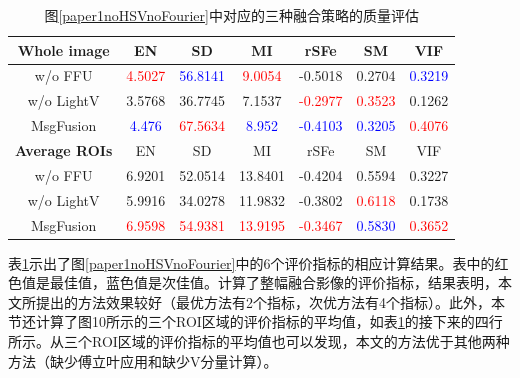      
\begin{table}[ht]
    \centering
  \caption{图\ref{paper1noHSVnoFourier}中对应的三种融合策略的质量评估}\label{paper1AblationIndex}
\begin{tabular}{ccccccc}
\hline
\textbf{Whole image}  &  EN         &  SD         &  MI         &  rSFe   &  SM         &  VIF  \\ \hline
w/o FFU                   &  \textcolor{red}{ 4.5027}      &  \textcolor{blue}{ 56.8141}     &  \textcolor{red}{ 9.0054}      & -0.5018                        & 0.2704                             &  \textcolor{blue}{ 0.3219} \\ 
w/o LightV                & 3.5768                             & 36.7745                            & 7.1537                             &  \textcolor{red}{ -0.2977} &  \textcolor{red}{ 0.3523}      & 0.1262                        \\ 
MsgFusion             &  \textcolor{blue}{ 4.476}       &  \textcolor{red}{ 67.5634}     &  \textcolor{blue}{ 8.952}       &  \textcolor{blue}{ -0.4103} &  \textcolor{blue}{ 0.3205}      &  \textcolor{red}{ 0.4076} \\ \hline
\textbf{Average ROIs} &  EN         &  SD         &  MI         &  rSFe   &  SM         &  VIF  \\ \hline
w/o FFU                   & 6.9201                        & 52.0514                        & 13.8401                        & -0.4204                   & 0.5594                             & 0.3227                   \\ 
w/o LightV                & 5.9916                             & 34.0278                        & 11.9832                            & -0.3802                   &  \textcolor{red}{ 0.6118} & 0.1738                   \\ 
MsgFusion             &  \textcolor{red}{ 6.9598} &  \textcolor{red}{ 54.9381} &  \textcolor{red}{ 13.9195} &  \textcolor{red}{ -0.3467} &  \textcolor{blue}{ 0.5830} &  \textcolor{red}{ 0.3652} \\ \hline
\end{tabular}
\end{table}

表\ref{paper1AblationIndex}示出了图\ref{paper1noHSVnoFourier}中的6个评价指标的相应计算结果。表中的红色值是最佳值，蓝色值是次佳值。计算了整幅融合影像的评价指标，结果表明，本文所提出的方法效果较好（最优方法有2个指标，次优方法有4个指标）。此外，本节还计算了图10所示的三个ROI区域的评价指标的平均值，如表\ref{paper1AblationIndex}的接下来的四行所示。从三个ROI区域的评价指标的平均值也可以发现，本文的方法优于其他两种方法（缺少傅立叶应用和缺少V分量计算）。

